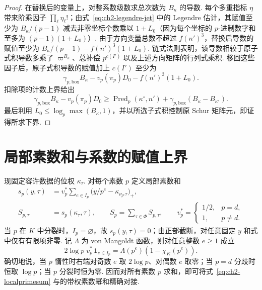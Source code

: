 \begin{proof}
在替换后的变量上，对整系数级数求总次数为 $B_\kappa$ 的导数. 每个多重指标 $\eta$ 带来阶乘因子 $\prod_\ell\eta_\ell!$；由式~\eqref{eq:ch2-legendre-jet} 中的 Legendre 估计，其赋值至少为 $B_\kappa/(p-1)$ 减去非零坐标个数乘以 $1+L_0$（因为每个坐标的 $p$-进制数字和至多为 $(p-1)(1+L_0)$）. 由于方向变量总数不超过 $f(n')^3$，替换后导数的赋值至少为 $B_\kappa/(p-1)-f(n')^3(1+L_0)$. 链式法则表明，该导数相较于原子式积导数多乘了 $\varpi^{B_\kappa}$、总补偿 $p^{c(I')}$ 以及上述方向矩阵的行列式乘积. 移回这些因子后，原子式积导数的赋值加上 $c(I')$ 至少为
\[
 \gamma_{p,\mathrm{box}} B_\kappa-v_p(\pi_p)D_0
 -f(n')^3(1+L_0).
\]
扣除项的计数上界给出
\[
 \gamma_{p,\mathrm{box}} B_\kappa-v_p(\pi_p)D_0
 \ge\operatorname{Pred}_p(\kappa^\circ,n')
   +\gamma_{p,\mathrm{box}}(B_\kappa-B_{\kappa^\circ}).
\]
最后利用 $L_0\le\log_p\max(B_\kappa,1)$，并以所选子式积控制原 Schur 矩阵元，即证得所求下界.
\end{proof}

\section{局部素数和与系数的赋值上界}
\label{sec:ch2-sharpness}

现固定容许数据的位权 $\kappa_\tau$. 对每个素数 $p$ 定义局部素数和
\begin{equation}
\label{eq:ch2-localprimesum}
\begin{aligned}
 s_p(y,\tau)&=v_p^*\sum_{e\in I_p}
      \bigl(y/p^e-\kappa_{\nu_{p^e}\tau}\bigr)_+,\\
 S_{p,\tau}&=s_p(\kappa_\tau,\tau),\qquad
 S_p=\sum_{\tau\in\Phi}S_{p,\tau},\qquad
 v_p^*=\begin{cases}1/2,&p=d,\\1,&p\ne d.\end{cases}
\end{aligned}
\end{equation}
当 $p$ 在 $K$ 中分裂时，$I_p=\varnothing$，故 $s_p(y,\tau)=0$；由正部截断，对任意固定 $y$ 和式中仅有有限项非零. 记 $\Lambda$ 为 von Mangoldt 函数，则对任意整数 $e\ge1$ 成立
\begin{equation}
\label{eq:ch2-weighted-primes}
 2\log p\;v_p^*\,\mathbf1_{e\in I_p}
 =\Lambda(p^e)(1-\chi_K(p^e)).
\end{equation}
确切地说，当 $p$ 惰性时右端对奇数 $e$ 取 $2\log p$、对偶数 $e$ 取零；当 $p=d$ 分歧时恒取 $\log p$；当 $p$ 分裂时恒为零. 因而对所有素数 $p$ 求和，即可将式~\eqref{eq:ch2-localprimesum} 与的带权素数幂和精确对接.

